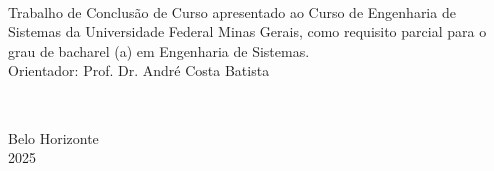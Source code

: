 
\newpage
\thispagestyle{empty}
\begin{center}
    \theauthor\\
    \vspace{5cm}
    \textbf{\MakeUppercase\thetitle} %
\end{center}
\vspace{5cm}
\hfill
\begin{minipage}{8cm}
    Trabalho de Conclusão de Curso apresentado ao Curso de Engenharia de Sistemas da Universidade Federal Minas Gerais, como requisito parcial para o grau de bacharel (a) em Engenharia de Sistemas.\\[3mm]
    Orientador: Prof. Dr. André Costa Batista %
\end{minipage}\\
\begin{center}
    \vspace*{\fill}
    Belo Horizonte\\2025
\end{center}